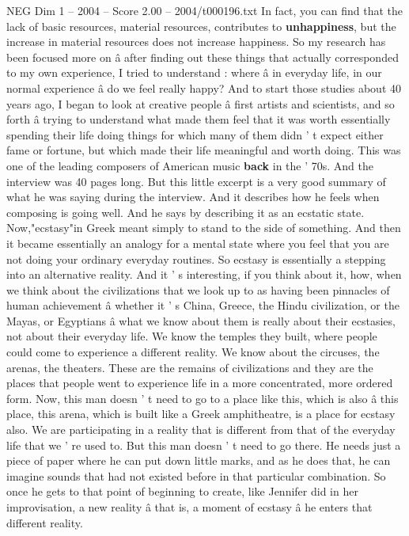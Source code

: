 \begin{textsample}{NEG Dim 1 – 2004 – Score 2.00 – 2004/t000196.txt}
In fact, you can find that the lack of basic resources, material resources, contributes to \textbf{unhappiness}, but the increase in material resources does not increase happiness.
So my research has been focused more on â after finding out these things that actually corresponded to my own experience, I tried to understand : where â in everyday life, in our normal experience â do we feel really happy?
And to start those studies about 40 years ago, I began to look at creative people â first artists and scientists, and so forth â trying to understand what made them feel that it was worth essentially spending their life doing things for which many of them didn ' t expect either fame or fortune, but which made their life meaningful and worth doing.
This was one of the leading composers of American music \textbf{back} in the ' 70s.
And the interview was 40 pages long.
But this little excerpt is a very good summary of what he was saying during the interview.
And it describes how he feels when composing is going well.
And he says by describing it as an ecstatic state.
Now,"ecstasy"in Greek meant simply to stand to the side of something.
And then it became essentially an analogy for a mental state where you feel that you are not doing your ordinary everyday routines.
So ecstasy is essentially a stepping into an alternative reality.
And it ' s interesting, if you think about it, how, when we think about the civilizations that we look up to as having been pinnacles of human achievement â whether it ' s China, Greece, the Hindu civilization, or the Mayas, or Egyptians â what we know about them is really about their ecstasies, not about their everyday life.
We know the temples they built, where people could come to experience a different reality.
We know about the circuses, the arenas, the theaters.
These are the remains of civilizations and they are the places that people went to experience life in a more concentrated, more ordered form.
Now, this man doesn ' t need to go to a place like this, which is also â this place, this arena, which is built like a Greek amphitheatre, is a place for ecstasy also.
We are participating in a reality that is different from that of the everyday life that we ' re used to.
But this man doesn ' t need to go there.
He needs just a piece of paper where he can put down little marks, and as he does that, he can imagine sounds that had not existed before in that particular combination.
So once he gets to that point of beginning to create, like Jennifer did in her improvisation, a new reality â that is, a moment of ecstasy â he enters that different reality.

\end{textsample}
